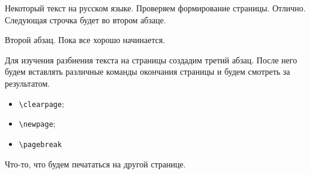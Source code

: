 \documentclass[14pt]{extarticle}
\begin{document}
Некоторый текст на русском языке. Проверяем формирование страницы. Отлично. Следующая строчка будет во втором абзаце. 

Второй абзац. Пока все хорошо начинается. 

Для изучения разбиения текста на страницы создадим третий абзац. После него будем вставлять различные команды окончания страницы и будем смотреть за результатом. 
\begin{itemize}
 \item \verb|\clearpage|;
 \item \verb|\newpage|;
 \item \verb|\pagebreak|
\end{itemize}
\pagebreak

Что-то, что будем печататься на другой странице.
\end{document}
